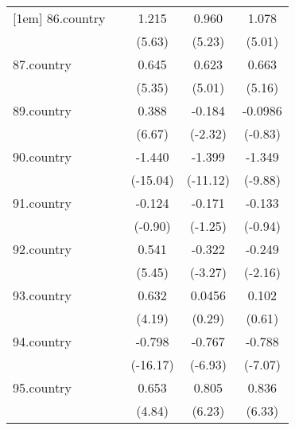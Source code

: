 {\begin{tabular}{l*{4}{c}}
[1em]
86.country  &                     &       1.215\sym{***}&       0.960\sym{***}&       1.078\sym{***}\\
            &                     &      (5.63)         &      (5.23)         &      (5.01)         \\
[1em]
87.country  &                     &       0.645\sym{***}&       0.623\sym{***}&       0.663\sym{***}\\
            &                     &      (5.35)         &      (5.01)         &      (5.16)         \\
[1em]
89.country  &                     &       0.388\sym{***}&      -0.184\sym{*}  &     -0.0986         \\
            &                     &      (6.67)         &     (-2.32)         &     (-0.83)         \\
[1em]
90.country  &                     &      -1.440\sym{***}&      -1.399\sym{***}&      -1.349\sym{***}\\
            &                     &    (-15.04)         &    (-11.12)         &     (-9.88)         \\
[1em]
91.country  &                     &      -0.124         &      -0.171         &      -0.133         \\
            &                     &     (-0.90)         &     (-1.25)         &     (-0.94)         \\
[1em]
92.country  &                     &       0.541\sym{***}&      -0.322\sym{**} &      -0.249\sym{*}  \\
            &                     &      (5.45)         &     (-3.27)         &     (-2.16)         \\
[1em]
93.country  &                     &       0.632\sym{***}&      0.0456         &       0.102         \\
            &                     &      (4.19)         &      (0.29)         &      (0.61)         \\
[1em]
94.country  &                     &      -0.798\sym{***}&      -0.767\sym{***}&      -0.788\sym{***}\\
            &                     &    (-16.17)         &     (-6.93)         &     (-7.07)         \\
[1em]
95.country  &                     &       0.653\sym{***}&       0.805\sym{***}&       0.836\sym{***}\\
            &                     &      (4.84)         &      (6.23)         &      (6.33)         \\

\end{tabular}}

